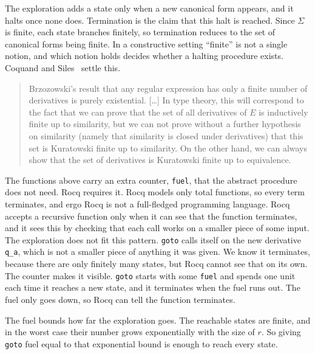 \begin{remark}[Termination]\label{rem:termination}
The exploration adds a state only when a new canonical form appears, and it halts
once none does. Termination is the claim that this halt is reached. Since $\Sigma$
is finite, each state branches finitely, so termination reduces to the set of
canonical forms being finite. In a constructive setting ``finite'' is not a single
notion, and which notion holds decides whether a halting procedure exists. Coquand
and Siles~\cite{CoquandRegexEquality} settle this.
\begin{quote}
Brzozowski's result that any regular expression has only a finite number of
derivatives is purely existential. [\ldots] In type theory, this will correspond to
the fact that we can prove that the set of all derivatives of $E$ is inductively
finite up to similarity, but we can not prove without a further hypothesis on
similarity (namely that similarity is closed under derivatives) that this set is
Kuratowski finite up to similarity. On the other hand, we can always show that the
set of derivatives is Kuratowski finite up to equivalence.
\end{quote}
\end{remark}

\begin{remark}\label{rem:fuel}
The functions above carry an extra counter, \texttt{fuel}, that the abstract procedure
does not need. Rocq requires it. Rocq models only total functions, so every term
terminates, and ergo Rocq is not a full-fledged programming language. Rocq accepts a
recursive function only when it can see that the function terminates, and it sees this by
checking that each call works on a smaller piece of some input. The exploration does not
fit this pattern. \texttt{goto} calls itself on the new derivative \texttt{q\_a}, which is
not a smaller piece of anything it was given. We know it terminates, because there are only
finitely many states, but Rocq cannot see that on its own. The counter makes it visible.
\texttt{goto} starts with some \texttt{fuel} and spends one unit each time it reaches a new
state, and it terminates when the fuel runs out. The fuel only goes down, so Rocq can tell
the function terminates.

The fuel bounds how far the exploration goes. The reachable states are finite, and in the
worst case their number grows exponentially with the size of $r$. So giving \texttt{goto}
fuel equal to that exponential bound is enough to reach every state.
\end{remark}

